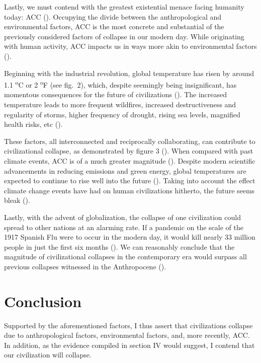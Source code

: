 Lastly, we must contend with the greatest existential menace facing humanity today: ACC (\cite{un2021biggestthreat}). Occupying the divide between the anthropological and environmental factors, ACC is the most concrete and substantial of the previously considered factors of collapse in our modern day. While originating with human activity, ACC impacts us in ways more akin to environmental factors (\cite[p.\ 896]{ipcc2014physical}). 

Beginning with the industrial revolution, global temperature has risen by around 1.1 \textsuperscript{o}C or 2 \textsuperscript{o}F (see fig.\ 2), which, despite seemingly being insignificant, has momentous consequences for the future of civilizations (\cite{lindsey2024globaltemp}). The increased temperature leads to more frequent wildfires, increased destructiveness and regularity of storms, higher frequency of drought, rising sea levels, magnified health risks, etc (\cites[p.\ 1]{diffenbaugh2021wildfire}[p.\ 4]{aumann2008frequency}[pp.\ 14–16]{dai2011drought}[p.\ 1]{meehl2005howmuch}[p.\ 5]{vermeer2009sealevel}{epa2022airquality}). 

These factors, all interconnected and reciprocally collaborating, can contribute to civilizational collapse, as demonstrated by figure 3 (\cite[p.\ 7]{kanter2009warming}). When compared with past climate events, ACC is of a much greater magnitude (\cite{nasa2010globalwarming}). Despite modern scientific advancements in reducing emissions and green energy, global temperatures are expected to continue to rise well into the future (\cite{ucar2021predictions}). Taking into account the effect climate change events have had on human civilizations hitherto, the future seems bleak (\cite[pp.\ 190–191]{natgeo2007visual}).

Lastly, with the advent of globalization, the collapse of one civilization could spread to other nations at an alarming rate. If a pandemic on the scale of the 1917 Spanish Flu were to occur in the modern day, it would kill nearly 33 million people in just the first six months (\cite{gates2018shattuck}). We can reasonably conclude that the magnitude of civilizational collapses in the contemporary era would surpass all previous collapses witnessed in the Anthropocene (\cite{juling2023future}). 

\section{Conclusion}

Supported by the aforementioned factors, I thus assert that civilizations collapse due to anthropological factors, environmental factors, and, more recently, ACC. In addition, as the evidence compiled in section IV would suggest, I contend that our civilization will collapse. 

